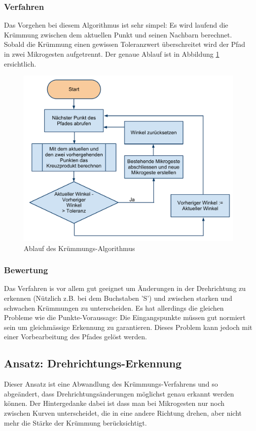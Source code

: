\subsubsection{Verfahren}
Das Vorgehen bei diesem Algorithmus ist sehr simpel: Es wird laufend die Krümmung zwischen dem aktuellen Punkt und seinen Nachbarn berechnet. Sobald die Krümmung einen gewissen Toleranzwert überschreitet wird der Pfad in zwei Mikrogesten aufgetrennt. Der genaue Ablauf ist in Abbildung \ref{curvature_flowchart} ersichtlich.

\begin{figure}[h!]
  \centering
    \includegraphics[width=\textwidth]{./img/CurvatureFlowchart.pdf}
  \caption{Ablauf des Krümmungs-Algorithmus}
  \label{curvature_flowchart}
\end{figure}

\subsubsection{Bewertung}
Das Verfahren is vor allem gut geeignet um Änderungen in der Drehrichtung zu erkennen (Nützlich z.B. bei dem Buchstaben 'S') und zwischen starken und schwachen Krümmungen zu unterscheiden. Es hat allerdings die gleichen Probleme wie die Punkte-Voraussage: Die Eingangspunkte müssen gut normiert sein um gleichmässige Erkennung zu garantieren. Dieses Problem kann jedoch mit einer Vorbearbeitung des Pfades gelöst werden.


\subsection{Ansatz: Drehrichtungs-Erkennung}
Dieser Ansatz ist eine Abwandlung des Krümmungs-Verfahrens und so abgeändert, dass Drehrichtungsänderungen möglichst genau erkannt werden können. Der Hintergedanke dabei ist dass man bei Mikrogesten nur noch zwischen Kurven unterscheidet, die in eine andere Richtung drehen, aber nicht mehr die Stärke der Krümmung berücksichtigt.

